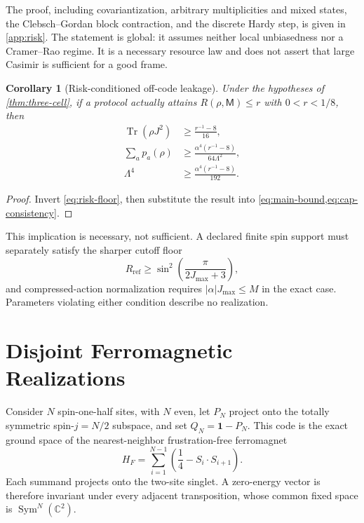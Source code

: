 \documentclass[11pt]{article}
\newtheorem{corollary}[theorem]{Corollary}
\theoremstyle{remark}
\newcommand{\1}{\mathbf 1}
\newcommand{\Tr}{\operatorname{Tr}}
\newcommand{\Rref}{R_{\mathrm{ref}}}
\begin{document}
The proof, including covariantization, arbitrary multiplicities and mixed
states, the Clebsch--Gordan block contraction, and the discrete Hardy step, is
given in \cref{app:risk}. The statement is global: it assumes neither local
unbiasedness nor a Cramer--Rao regime. It is a necessary resource law and does
not assert that large Casimir is sufficient for a good frame.

\begin{corollary}[Risk-conditioned off-code leakage]
\label{cor:risk-leakage}
Under the hypotheses of \cref{thm:three-cell}, if a protocol actually attains
$R(\rho,\mathsf M)\leq r$ with $0<r<1/8$, then
\begin{align}
  \Tr(\rho J^2)
  &\geq\frac{r^{-1}-8}{16},
  \label{eq:risk-casimir}\\
  \sum_a p_a(\rho)
  &\geq\frac{\alpha^4(r^{-1}-8)}{64\Lambda^2},
  \label{eq:risk-weight}\\
  \Lambda^4
  &\geq\frac{\alpha^4(r^{-1}-8)}{192}.
  \label{eq:risk-amplitude}
\end{align}
\end{corollary}

\begin{proof}
Invert \cref{eq:risk-floor}, then substitute the result into
\cref{eq:main-bound,eq:cap-consistency}.
\end{proof}

This implication is necessary, not sufficient. A declared finite spin support
must separately satisfy the sharper cutoff floor
\[
  \Rref\geq\sin^2\!\left(\frac{\pi}{2J_{\max}+3}\right),
\]
and compressed-action normalization requires
$|\alpha|J_{\max}\leq M$ in the exact case. Parameters violating either
condition describe no realization.

\section{Disjoint Ferromagnetic Realizations}
\label{sec:model}

Consider $N$ spin-one-half sites, with $N$ even, let $P_N$ project onto the
totally symmetric spin-$j=N/2$ subspace, and set $Q_N=\1-P_N$. This code is the
exact ground space of the nearest-neighbor frustration-free ferromagnet
\begin{equation}
  H_F=\sum_{i=1}^{N-1}\left(\frac14-S_i\cdot S_{i+1}\right).
  \label{eq:ferromagnet}
\end{equation}
Each summand projects onto the two-site singlet. A zero-energy vector is
therefore invariant under every adjacent transposition, whose common fixed
space is $\operatorname{Sym}^N(\mathbb C^2)$.
\end{document}
